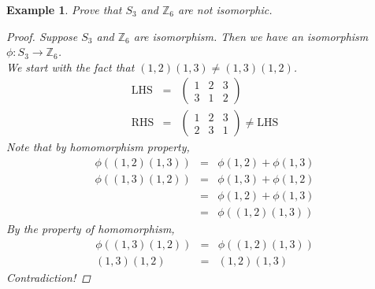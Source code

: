 \documentclass{article}
\theoremstyle{MyNonumberplain}
\theoremstyle{break}
\newtheorem*{proof}{Proof. }
\newcommand{\p}{\phi}
\newcommand{\tmop}{\text}
\theoremstyle{break}
\newtheorem{example}{Example}[section]
\theoremstyle{break}
\theoremstyle{definition}
\theoremstyle{break}
\begin{document}
\begin{expbox}
    \begin{example}
        Prove that $S_3$ and $\mathbb{Z}_6$ are not isomorphic.
        \begin{prfbox}
            \begin{proof}
                Suppose $S_3$ and $\mathbb{Z}_6$ are isomorphism. Then we have an isomorphism
                $\p : S_3 \rightarrow \mathbb{Z}_6$.\\

                We start with the fact that $(1, 2) (1, 3) \neq (1, 3) (1, 2)$.\\

                \begin{eqnarray*}
                \tmop{LHS} & = & \left(\begin{array}{ccc}
                    1 & 2 & 3\\
                    3 & 1 & 2
                \end{array}\right)\\
                \tmop{RHS} & = & \left(\begin{array}{ccc}
                    1 & 2 & 3\\
                    2 & 3 & 1
                \end{array}\right) \neq \tmop{LHS}
                \end{eqnarray*}
                Note that by homomorphism property,
                \begin{eqnarray*}
                \p ((1, 2) (1, 3)) & = & \p (1, 2) + \p (1, 3)\\
                \p ((1, 3) (1, 2)) & = & \p (1, 3) + \p (1, 2)\\
                & = & \p (1, 2) + \p (1, 3)\\
                & = & \p ((1, 2) (1, 3))
                \end{eqnarray*}
                By the property of homomorphism,
                \begin{eqnarray*}
                \p ((1, 3) (1, 2)) & = & \p ((1, 2) (1, 3))\\
                (1, 3) (1, 2) & = & (1, 2) (1, 3)
                \end{eqnarray*}
                Contradiction!
            \end{proof}
        \end{prfbox}
    \end{example}
\end{expbox}
\end{document}
